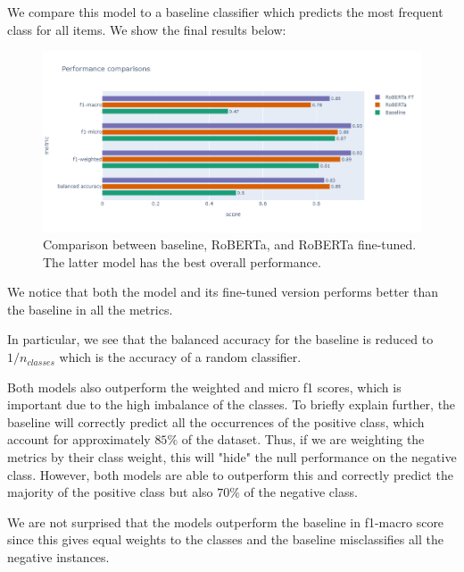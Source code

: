 \documentclass[a4paper,10pt, openright]{article}
\begin{document}
We compare this model to a baseline classifier which predicts the most frequent class for all items. We show the final results below:

\begin{figure}[H]
	\begin{center}
		\includegraphics[width=18 cm, height=9 cm]{./Images/perfcomp.png}
		\caption{Comparison between baseline, RoBERTa, and RoBERTa fine-tuned. The latter model has the best overall performance.}
		\label{fig:perfcomp}
	\end{center}
\end{figure}

We notice that both the model and its fine-tuned version performs better than the baseline in all the metrics.

In particular, we see that the balanced accuracy for the baseline is reduced to $1/n_{classes}$ which is the accuracy of a random classifier. 

Both models also outperform the weighted and micro f1 scores, which is important due to the high imbalance of the classes. To briefly explain further, the baseline will correctly predict all the occurrences of the positive class, which account for approximately $85\%$ of the dataset. Thus, if we are weighting the metrics by their class weight, this will "hide" the null performance on the negative class. However, both models are able to outperform this and correctly predict the majority of the positive class but also $70\%$ of the negative class.

We are not surprised that the models outperform the baseline in f1-macro score since this gives equal weights to the classes and the baseline misclassifies all the negative instances. 
\end{document}

